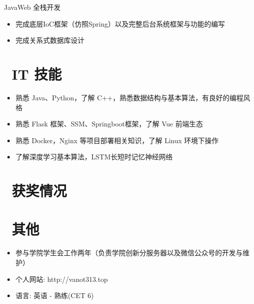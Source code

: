 \documentclass{resume}
\begin{document}
\begin{onehalfspacing}
JavaWeb 全栈开发
\begin{itemize}
  \item 完成底层IoC框架（仿照Spring）以及完整后台系统框架与功能的编写
  \item 完成关系式数据库设计
\end{itemize}
\end{onehalfspacing}


\section{\faCogs\ IT 技能}
\begin{itemize}[parsep=0.5ex]
  \item 熟悉 Java、Python，了解 C++，熟悉数据结构与基本算法，有良好的编程风格
  \item 熟悉 Flask 框架、SSM、Springboot框架，了解 Vue 前端生态
  \item 熟悉 Docker，Nginx 等项目部署相关知识，了解 Linux 环境下操作
  \item 了解深度学习基本算法，LSTM长短时记忆神经网络
\end{itemize}

\section{\faHeartO\ 获奖情况}

\section{\faInfo\ 其他}
\begin{itemize}[parsep=0.5ex]
  \item 参与学院学生会工作两年（负责学院创新分服务器以及微信公众号的开发与维护）
  \item 个人网站: http://vanot313.top
  \item 语言: 英语 - 熟练(CET 6)
\end{itemize}

%
%
\end{document}
